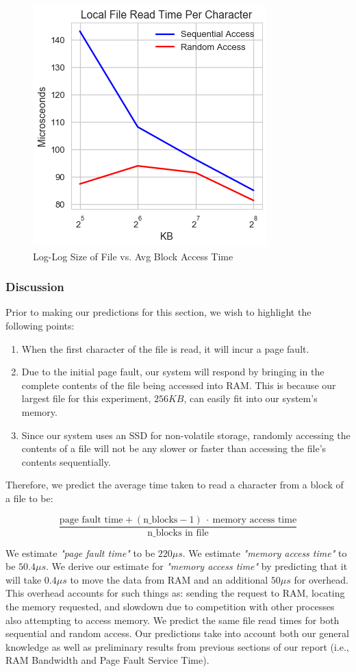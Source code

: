 \documentclass[sigconf]{acmart}
\begin{document}
\begin{figure}[h]
\includegraphics[scale=0.7]{images/file_read_time.png}
\caption{Log-Log Size of File vs. Avg Block Access Time}
\label{FileReadTimePlot}
\end{figure}

\subsubsection{Discussion}
Prior to making our predictions for this section, we wish to highlight the following points:

\begin{enumerate}
	\item When the first character of the file is read, it will incur a page fault.
	\item Due to the initial page fault, our system will respond by bringing in the complete contents of the file being accessed into RAM. This is because our largest file for this experiment, $256KB$, can easily fit into our system's memory.
	\item Since our system uses an SSD for non-volatile storage, randomly accessing the contents of a file will not be any slower or faster than accessing the file's contents sequentially.
\end{enumerate}

Therefore, we predict the average time taken to read a character from a block of a file to be:

$$\frac{\text{page fault time} + (\text{n\_blocks} - 1)\ \cdot\ \text{memory access time}} {\text{n\_blocks in file}}$$
  
We estimate \textit{"page fault time"} to be $220\mu s$. We estimate \textit{"memory access time"} to be $50.4\mu s$. We derive our estimate for \textit{"memory access time"} by predicting that it will take $0.4\mu s$ to move the data from RAM and an additional $50 \mu s$ for overhead. This overhead accounts for such things as: sending the request to RAM, locating the memory requested, and slowdown due to competition with other processes also attempting to access memory. We predict the same file read times for both sequential and random access. Our predictions take into account both our general knowledge as well as preliminary results from previous sections of our report (i.e., RAM Bandwidth and Page Fault Service Time).
\end{document}
